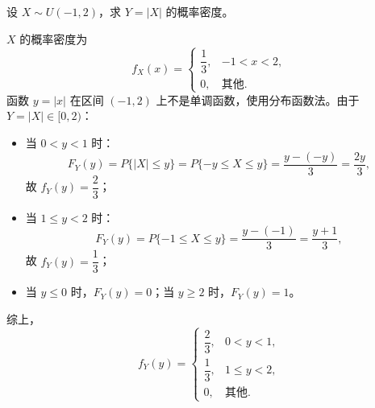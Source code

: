 ﻿\documentclass[lang=cn,11pt]{elegantbook}
\begin{document}
\begin{exercise}[均匀分布绝对值变换] \label{exer:2-51}
设 $X\sim U(-1,2)$，求 $Y=|X|$ 的概率密度。
\end{exercise}
\begin{solution}
$X$ 的概率密度为
\[
f_X(x)=
\begin{cases}
\dfrac{1}{3}, & -1<x<2, \\[6pt]
0, & \text{其他}.
\end{cases}
\]
函数 $y=|x|$ 在区间 $(-1,2)$ 上不是单调函数，使用分布函数法。由于 $Y=|X|\in[0,2)$：
\begin{itemize}
    \item 当 $0<y<1$ 时：
    \[
    F_Y(y) = P\{|X|\leqslant y\} = P\{-y\leqslant X\leqslant y\} = \frac{y-(-y)}{3} = \frac{2y}{3},
    \]
    故 $f_Y(y)=\dfrac{2}{3}$；
    \item 当 $1\leqslant y<2$ 时：
    \[
    F_Y(y) = P\{-1\leqslant X\leqslant y\} = \frac{y-(-1)}{3} = \frac{y+1}{3},
    \]
    故 $f_Y(y)=\dfrac{1}{3}$；
    \item 当 $y\leqslant0$ 时，$F_Y(y)=0$；当 $y\geqslant2$ 时，$F_Y(y)=1$。
\end{itemize}
综上，
\[
f_Y(y)=
\begin{cases}
\dfrac{2}{3}, & 0<y<1, \\[6pt]
\dfrac{1}{3}, & 1\leqslant y<2, \\[6pt]
0, & \text{其他}.
\end{cases}
\]
\end{solution}
\end{document}
